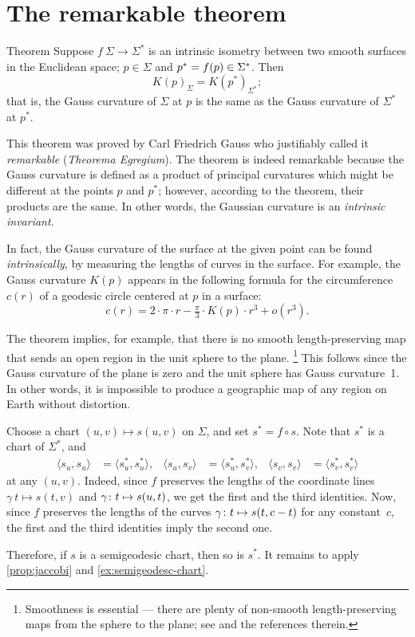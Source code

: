 \section{The remarkable theorem}


\begin{thm}{Theorem}\label{thm:remarkable}
Suppose $f\:\Sigma\to \Sigma^{*}$ is an intrinsic isometry between two smooth surfaces in the Euclidean space; $p\in \Sigma$ and $p^{*}\z=f(p)\in \Sigma^{*}$.
Then 
\[K(p)_{\Sigma}=K(p^{*})_{\Sigma^{*}};\]
that is, the Gauss curvature of $\Sigma$ at $p$ is the same as the Gauss curvature of $\Sigma^{*}$ at $p^{*}$.
\end{thm}

This theorem was proved by Carl Friedrich Gauss \cite{gauss} who justifiably called it \emph{remarkable} (\emph{Theorema Egregium}).
The theorem is indeed remarkable because the Gauss curvature is defined as a product of principal curvatures which might be different at the points $p$ and $p^*$; however, according to the theorem, their products are the same.
In other words, the Gaussian curvature is an \textit{intrinsic invariant}.

In fact, the Gauss curvature of the surface at the given point can be found \textit{intrinsically},
by measuring the lengths of curves in the surface.
For example, the Gauss curvature $K(p)$ appears in the following formula for the circumference $c(r)$ of a geodesic circle centered at $p$ in a surface: 
\[c(r)=2\cdot\pi\cdot r-\tfrac\pi3\cdot K(p)\cdot r^3+o(r^3).\]

The theorem implies, for example, that there is no smooth length-preserving map that sends an open region in the unit sphere to the plane.%
\footnote{Smoothness is essential --- there are plenty of non-smooth length-preserving maps from the sphere to the plane; see \cite{petrunin-yashinski} and the references therein.}
This follows since the Gauss curvature of the plane is zero and the unit sphere has Gauss curvature~1. 
In other words, it is impossible to produce a geographic map of any region on Earth without distortion.

Choose a chart $(u,v)\mapsto s(u,v)$ on $\Sigma$, and set
$s^{*} =f\circ s$.
Note that $s^{*}$ is a chart of $\Sigma^{*}$, and 
\begin{align*}
\langle s_u,s_u\rangle
&=
\langle s_u^{*}, s_u^{*}\rangle,
&
\langle s_u, s_v\rangle
&=
\langle s_u^{*}, s_v^{*}\rangle,
&
\langle s_v, s_v\rangle
&=
\langle s_v^{*}, s_v^{*}\rangle
\end{align*}
at any $(u,v)$.
Indeed, since $f$ preserves the lengths of the coordinate lines $\gamma\:t\mapsto s(t,v)$ and  $\gamma\:t\z\mapsto s(u,t)$, we get the first and the third identities.
Now, since $f$ preserves the lengths of the curves $\gamma\:t\z\mapsto s(t,c-t)$ for any constant~$c$, the first and the third identities imply the second one.

Therefore, if $s$ is a semigeodesic chart, then so is $s^{*}$.
It remains to apply \ref{prop:jaccobi} and \ref{ex:semigeodesc-chart}.
\qeds

